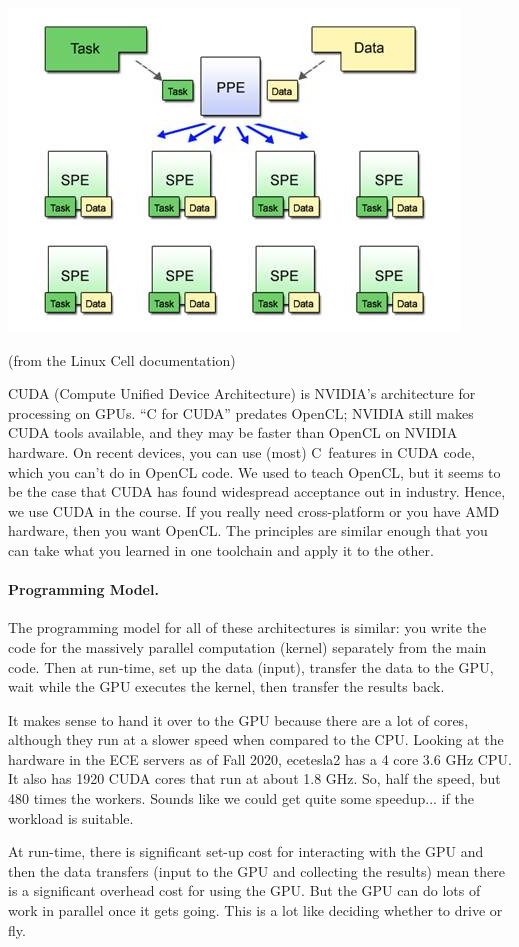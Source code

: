 \documentclass[a4paper]{report}
\newcommand{\CPP}{C\nolinebreak\hspace{-.05em}\raisebox{.4ex}{\tiny\bf +}\nolinebreak\hspace{-.10em}\raisebox{.4ex}{\tiny\bf +}}
\def\CPP{{C\nolinebreak[4]\hspace{-.05em}\raisebox{.4ex}{\tiny\bf ++}}}
\begin{document}
\begin{center}
\includegraphics[width=.4\textwidth]{images/cell.jpg}
\end{center}
\hfill (from the Linux Cell documentation)

CUDA (Compute Unified Device Architecture) is NVIDIA's architecture
for processing on GPUs. ``C for CUDA'' predates OpenCL; NVIDIA still
makes CUDA tools available, and they may be faster than OpenCL on NVIDIA
hardware. On recent devices, you can use (most) \CPP~features in CUDA code,
which you can't do in OpenCL code. We used to teach OpenCL, but it seems
to be the case that CUDA has found widespread acceptance out in industry.
Hence, we use CUDA in the course. If you really need cross-platform or 
you have AMD hardware, then you want OpenCL. The principles are similar 
enough that you can take what you learned in one toolchain and apply it 
to the other.

\paragraph{Programming Model.} The programming
model for all of these architectures is similar: you write the code for
the massively parallel computation (kernel) separately from the main
code. Then at run-time, set up the data (input), transfer the data to the GPU, wait while the GPU executes the kernel, then transfer the results back. 

It makes sense to hand it over to the GPU because there are a lot of cores, although they run at a slower speed when compared to the CPU. Looking at the hardware in the ECE servers as of Fall 2020, ecetesla2 has a 4 core 3.6 GHz CPU. It also has 1920 CUDA cores that run at about 1.8 GHz. So, half the speed, but 480 times the workers. Sounds like we could get quite some speedup... if the workload is suitable.

At run-time, there is significant set-up cost for interacting with the GPU and then the data transfers (input to the GPU and collecting the results) mean there is a significant overhead cost for using the GPU. But the GPU can do lots of work in parallel once it gets going. This is a lot like deciding whether to drive or fly. 
\end{document}
